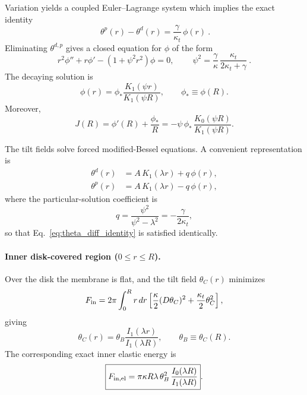 \documentclass[11pt]{article}
\begin{document}
Variation yields a coupled Euler--Lagrange system which implies the exact identity
\begin{equation}
\boxed{\ \theta^p(r)-\theta^d(r)=\frac{\gamma}{\kappa_t}\,\phi(r)\ }.
\label{eq:theta_diff_identity}
\end{equation}
Eliminating $\theta^{d,p}$ gives a closed equation for $\phi$ of the form
\begin{equation}
r^2\phi''+r\phi'-(1+\psi^2 r^2)\phi=0,
\qquad
\boxed{\ \psi^2=\frac{\gamma}{\kappa}\,\frac{\kappa_t}{2\kappa_t+\gamma}\ }.
\end{equation}
The decaying solution is
\begin{equation}
\boxed{
\phi(r)=\phi_*\frac{K_1(\psi r)}{K_1(\psi R)}
},
\qquad \phi_*\equiv \phi(R).
\label{eq:phi_outer}
\end{equation}
Moreover,
\begin{equation}
J(R)=\phi'(R)+\frac{\phi_*}{R}
=-\psi\,\phi_*\,\frac{K_0(\psi R)}{K_1(\psi R)}.
\end{equation}

The tilt fields solve forced modified-Bessel equations.
A convenient representation is
\begin{align}
\theta^d(r)&=A\,K_1(\lambda r)+q\,\phi(r),\\
\theta^p(r)&=A\,K_1(\lambda r)-q\,\phi(r),
\end{align}
where the particular-solution coefficient is
\begin{equation}
q=\frac{\psi^2}{\psi^2-\lambda^2}=-\frac{\gamma}{2\kappa_t},
\end{equation}
so that Eq.~\eqref{eq:theta_diff_identity} is satisfied identically.

\paragraph{Inner disk-covered region ($0\le r\le R$).}
Over the disk the membrane is flat, and the tilt field $\theta_C(r)$ minimizes
\begin{equation}
F_{\rm in}
=2\pi\int_0^R r\,dr
\left[
\frac{\kappa}{2}(D\theta_C)^2+\frac{\kappa_t}{2}\theta_C^2
\right],
\end{equation}
giving
\begin{equation}
\boxed{
\theta_C(r)=\theta_B\frac{I_1(\lambda r)}{I_1(\lambda R)}
},
\qquad \theta_B\equiv \theta_C(R).
\label{eq:thetaC_inner}
\end{equation}
The corresponding exact inner elastic energy is
\begin{equation}
\boxed{
F_{\rm in,el}
=\pi\kappa R\lambda\,\theta_B^2\,\frac{I_0(\lambda R)}{I_1(\lambda R)}
}.
\label{eq:Fin_el}
\end{equation}
\end{document}
